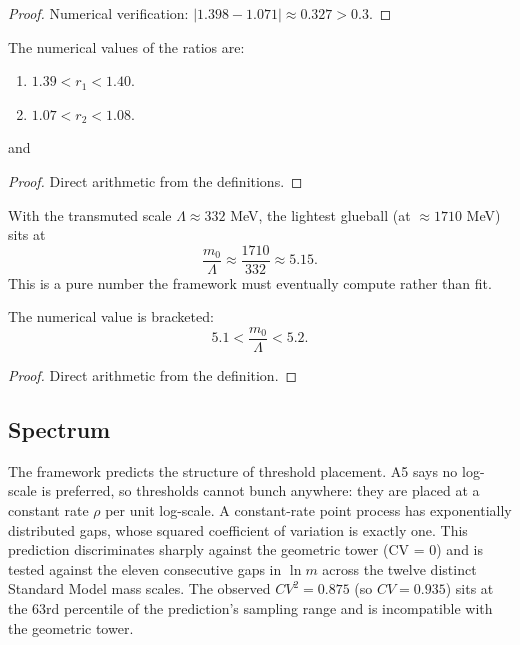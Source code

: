 \begin{proof}
Numerical verification: $|1.398 - 1.071| \approx 0.327 > 0.3$.
\end{proof}

\begin{theorem}
The numerical values of the ratios are:
\begin{enumerate}
\item $1.39 < r_1 < 1.40$.
\item $1.07 < r_2 < 1.08$.
\end{enumerate}
 and 
\end{theorem}

\begin{proof}
Direct arithmetic from the definitions.
\end{proof}

\begin{definition}
With the transmuted scale $\Lambda \approx 332$ MeV, the lightest glueball (at $\approx 1710$ MeV) sits at
\begin{equation}
\frac{m_0}{\Lambda} \approx \frac{1710}{332} \approx 5.15 .
\end{equation}
This is a pure number the framework must eventually compute rather than fit.
\end{definition}

\begin{theorem}
The numerical value is bracketed:
\begin{equation}
5.1 < \frac{m_0}{\Lambda} < 5.2 .
\end{equation}
\end{theorem}

\begin{proof}
Direct arithmetic from the definition.
\end{proof}

\subsection{Spectrum}

The framework predicts the structure of threshold placement. A5 says no log-scale is preferred, so thresholds cannot bunch anywhere: they are placed at a constant rate $\rho$ per unit log-scale. A constant-rate point process has exponentially distributed gaps, whose squared coefficient of variation is exactly one. This prediction discriminates sharply against the geometric tower (CV = 0) and is tested against the eleven consecutive gaps in $\ln m$ across the twelve distinct Standard Model mass scales. The observed $CV^2 = 0.875$ (so $CV = 0.935$) sits at the 63rd percentile of the prediction's sampling range and is incompatible with the geometric tower.

